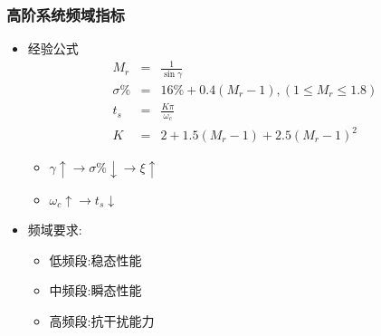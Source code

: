 \documentclass[table]{beamer}
\begin{document}
\begin{frame}
\frametitle{高阶系统频域指标}
\label{sec-5-3-4}
\begin{itemize}

\item 经验公式
\label{sec-5-3-4-1}%
\begin{eqnarray*}
M_r & = & \frac{1}{\sin\gamma}\\
\sigma\% &=& 16\%+0.4(M_r-1), (1\leq M_r\leq 1.8) \\
t_s &=& \frac{K\pi}{\omega_c}\\
K&=& 2+1.5(M_r-1)+2.5(M_r-1)^2 
\end{eqnarray*}

\begin{itemize}
\item <2->$\gamma\uparrow \rightarrow \sigma\%\downarrow \rightarrow \xi\uparrow$
\item <3->$\omega_c\uparrow \rightarrow t_s\downarrow$
\end{itemize}


\item 频域要求:
\label{sec-5-3-4-2}%
\begin{itemize}
\item 低频段:稳态性能
\item 中频段:瞬态性能
\item 高频段:抗干扰能力
\end{itemize}

\end{itemize} %
\end{frame}
\end{document}
